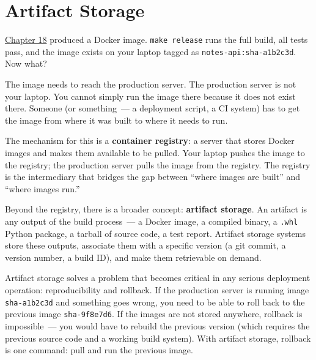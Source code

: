 \setcounter{chapter}{18}
\chapter{Artifact Storage}\label{ch:19-artifact-storage}

\chapterrule

\hyperref[ch:18-containerization]{Chapter 18} produced a Docker image. \texttt{make\ release} runs the full build, all tests pass, and the image exists on your laptop tagged as \texttt{notes-api:sha-a1b2c3d}. Now what?

The image needs to reach the production server. The production server is not your laptop. You cannot simply run the image there because it does not exist there. Someone (or something~--- a deployment script, a CI system) has to get the image from where it was built to where it needs to run.

The mechanism for this is a \textbf{container registry}: a server that stores Docker images and makes them available to be pulled. Your laptop pushes the image to the registry; the production server pulls the image from the registry. The registry is the intermediary that bridges the gap between ``where images are built'' and ``where images run.''

Beyond the registry, there is a broader concept: \textbf{artifact storage}. An artifact is any output of the build process~--- a Docker image, a compiled binary, a \texttt{.whl} Python package, a tarball of source code, a test report. Artifact storage systems store these outputs, associate them with a specific version (a git commit, a version number, a build ID), and make them retrievable on demand.

Artifact storage solves a problem that becomes critical in any serious deployment operation: reproducibility and rollback. If the production server is running image \texttt{sha-a1b2c3d} and something goes wrong, you need to be able to roll back to the previous image \texttt{sha-9f8e7d6}. If the images are not stored anywhere, rollback is impossible~--- you would have to rebuild the previous version (which requires the previous source code and a working build system). With artifact storage, rollback is one command: pull and run the previous image.

